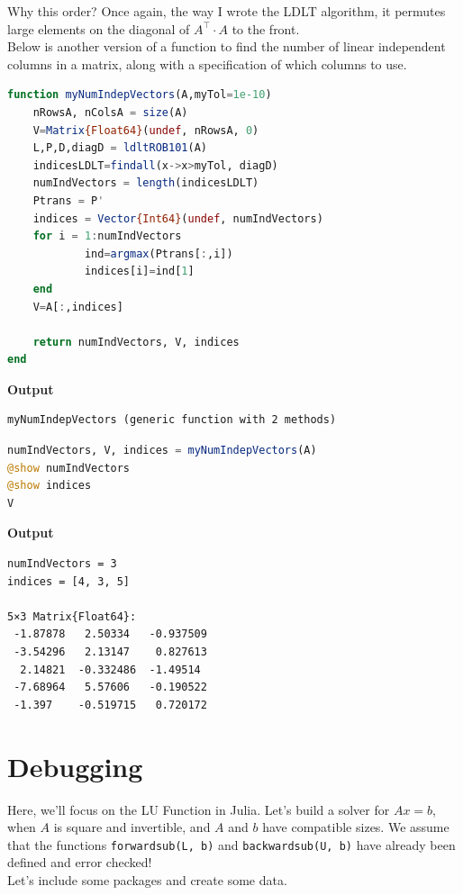 Why this order? Once again, the way I wrote the LDLT algorithm, it permutes large elements on the diagonal of $A^\top \cdot A$ to the front.\\

Below is another version of a function to find the number of linear independent columns in a matrix, along with a specification of which columns to use.

\begin{lstlisting}[language=Julia,style=mystyle]
function myNumIndepVectors(A,myTol=1e-10)
    nRowsA, nColsA = size(A)
    V=Matrix{Float64}(undef, nRowsA, 0)
    L,P,D,diagD = ldltROB101(A)
    indicesLDLT=findall(x->x>myTol, diagD)
    numIndVectors = length(indicesLDLT)
    Ptrans = P'
    indices = Vector{Int64}(undef, numIndVectors)
    for i = 1:numIndVectors
            ind=argmax(Ptrans[:,i])
            indices[i]=ind[1] 
    end
    V=A[:,indices]
        
    return numIndVectors, V, indices
end
\end{lstlisting}
\textbf{Output} 
\begin{verbatim}
myNumIndepVectors (generic function with 2 methods)
\end{verbatim}


\begin{lstlisting}[language=Julia,style=mystyle]
numIndVectors, V, indices = myNumIndepVectors(A)
@show numIndVectors
@show indices
V
\end{lstlisting}
\textbf{Output} 
\begin{verbatim}
numIndVectors = 3
indices = [4, 3, 5]

5×3 Matrix{Float64}:
 -1.87878   2.50334   -0.937509
 -3.54296   2.13147    0.827613
  2.14821  -0.332486  -1.49514
 -7.68964   5.57606   -0.190522
 -1.397    -0.519715   0.720172
\end{verbatim}

\section{Debugging}

Here, we'll focus on the LU Function in Julia. Let's build a solver for $Ax=b$, when $A$ is square and invertible, and $A$ and $b$ have compatible sizes. We assume that the functions \texttt{forwardsub(L, b)} and \texttt{backwardsub(U, b)} have already been defined and error checked!\\

Let's include some packages and create some data.

